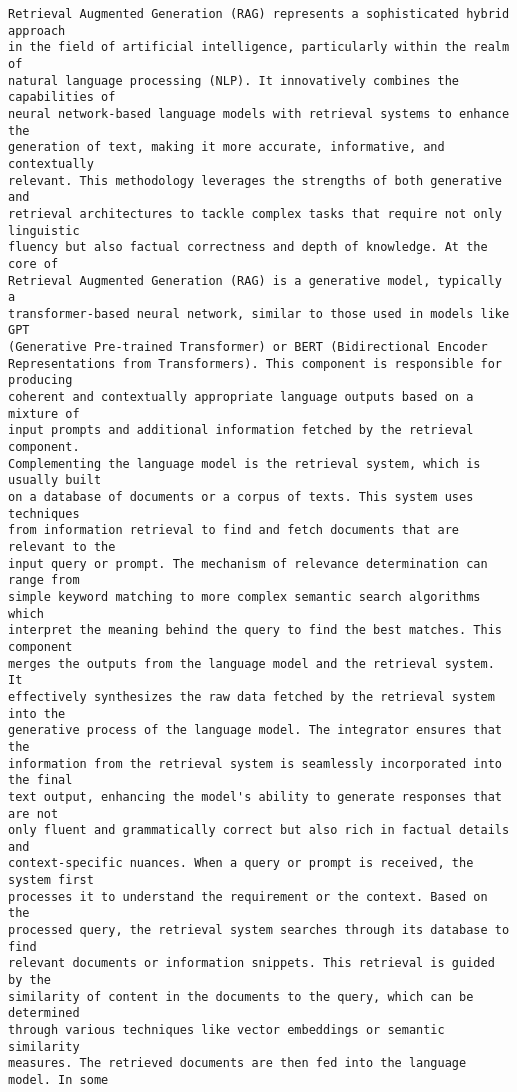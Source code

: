 \documentclass[11pt]{article}
\begin{document}
    \begin{Verbatim}[commandchars=\\\{\}]
Retrieval Augmented Generation (RAG) represents a sophisticated hybrid approach
in the field of artificial intelligence, particularly within the realm of
natural language processing (NLP). It innovatively combines the capabilities of
neural network-based language models with retrieval systems to enhance the
generation of text, making it more accurate, informative, and contextually
relevant. This methodology leverages the strengths of both generative and
retrieval architectures to tackle complex tasks that require not only linguistic
fluency but also factual correctness and depth of knowledge. At the core of
Retrieval Augmented Generation (RAG) is a generative model, typically a
transformer-based neural network, similar to those used in models like GPT
(Generative Pre-trained Transformer) or BERT (Bidirectional Encoder
Representations from Transformers). This component is responsible for producing
coherent and contextually appropriate language outputs based on a mixture of
input prompts and additional information fetched by the retrieval component.
Complementing the language model is the retrieval system, which is usually built
on a database of documents or a corpus of texts. This system uses techniques
from information retrieval to find and fetch documents that are relevant to the
input query or prompt. The mechanism of relevance determination can range from
simple keyword matching to more complex semantic search algorithms which
interpret the meaning behind the query to find the best matches. This component
merges the outputs from the language model and the retrieval system. It
effectively synthesizes the raw data fetched by the retrieval system into the
generative process of the language model. The integrator ensures that the
information from the retrieval system is seamlessly incorporated into the final
text output, enhancing the model's ability to generate responses that are not
only fluent and grammatically correct but also rich in factual details and
context-specific nuances. When a query or prompt is received, the system first
processes it to understand the requirement or the context. Based on the
processed query, the retrieval system searches through its database to find
relevant documents or information snippets. This retrieval is guided by the
similarity of content in the documents to the query, which can be determined
through various techniques like vector embeddings or semantic similarity
measures. The retrieved documents are then fed into the language model. In some

\end{Verbatim}
\end{document}
